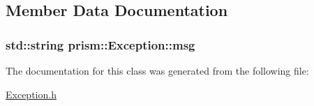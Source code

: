 \subsection{Member Data Documentation}
\subsubsection[{\texorpdfstring{msg}{msg}}]{\setlength{\rightskip}{0pt plus 5cm}std\+::string prism\+::\+Exception\+::msg\hspace{0.3cm}{\ttfamily [protected]}}\hypertarget{classprism_1_1_exception_ab768e96bc8a3f617b3420e19a18caf9f}{}\label{classprism_1_1_exception_ab768e96bc8a3f617b3420e19a18caf9f}


The documentation for this class was generated from the following file\+:\begin{DoxyCompactItemize}
\item 
\hyperlink{_exception_8h}{Exception.\+h}\end{DoxyCompactItemize}
